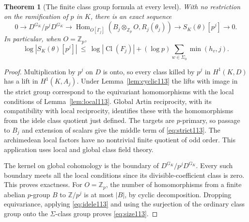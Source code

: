 \documentclass[a4paper,11pt]{article}
\newtheorem{theorem}[proposition]{Theorem}
\theoremstyle{definition}
\theoremstyle{remark}
\newcommand{\ZZ}{\mathbb Z}\newcommand{\ord}{\operatorname{ord}}
\numberwithin{equation}{section}
\newcommand{\Cl}{\operatorname{Cl}}
\begin{document}
\begin{theorem}[The finite class group formula at every level]
\label{thm:strict113}
With no restriction on the ramification of \(p\) in \(K\), there
is an exact sequence
\begin{equation}
 0\longrightarrow D^{G_K}/p^jD^{G_K}
 \longrightarrow \operatorname{Hom}_{O[\Gamma_j]}
             (B_j\otimes_{\ZZ_p}O,R_j(\theta_j))
 \longrightarrow S_K(\theta)[p^j]\longrightarrow0 .
 \label{eq:strict113}
\end{equation}
In particular, when \(O=\ZZ_p\),
\begin{equation}
 \log|S_K(\theta)[p^j]|
 \ \le\ \log|\Cl(F_j)|+
           (\log p)\sum_{w\in\Sigma_0}\min(h_v,j).
 \label{eq:size113}
\end{equation}
\end{theorem}
\begin{proof}
Multiplication by \(p^j\) on \(D\) is onto, so every class killed
by \(p^j\) in \(H^1(K,D)\) has a lift in \(H^1(K,A_j)\).
Under Lemma~\ref{lem:cyclic113} the lifts with image in the strict
group correspond to the equivariant homomorphisms with the local
conditions of Lemma~\ref{lem:local113}. Global Artin reciprocity,
with its compatibility with local reciprocity, identifies these
with the homomorphisms from the idele class quotient just defined.
The targets are \(p\)-primary, so passage to \(B_j\) and extension
of scalars give the middle term of \eqref{eq:strict113}.
The archimedean local factors have no nontrivial finite quotient
of odd order. This application uses local and global class field
theory.~\cite{II-II-V-cft101}

The kernel on global cohomology is the boundary of
\(D^{G_K}/p^jD^{G_K}\). Every such boundary meets all the local
conditions since its divisible-coefficient class is zero. This
proves exactness. For \(O=\ZZ_p\), the number of homomorphisms
from a finite abelian \(p\)-group \(B\) to \(\ZZ/p^j\) is at
most \(|B|\), by cyclic decomposition. Dropping equivariance,
applying \eqref{eq:idele113} and using the surjection of the
ordinary class group onto the \(\Sigma\)-class group proves
\eqref{eq:size113}.
\end{proof}
\end{document}
